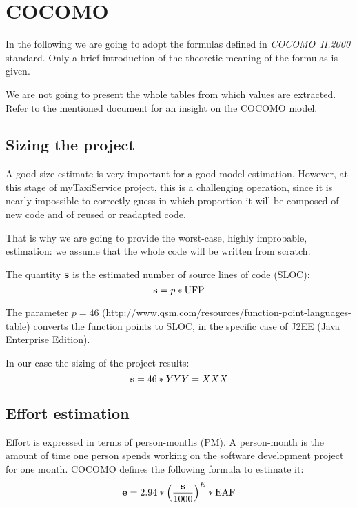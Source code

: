 \section{COCOMO}


In the following we are going to adopt the formulas defined in \mbox{\emph{COCOMO II.2000}} standard. Only a brief introduction of the theoretic meaning of the formulas is given. 

We are not going to present the whole tables from which values are extracted. Refer to the mentioned document for an insight on the COCOMO model. 


\subsection{Sizing the project}

A good size estimate is very important for a good model estimation. However, at this stage of myTaxiService project, this is a challenging operation, since it is nearly impossible to correctly guess in which proportion it will be composed of new code and of reused or readapted code.

That is why we are going to provide the \mbox{worst-case}, highly improbable, estimation: we assume that the whole code will be written from scratch. 

The quantity $\mathbf{s}$ is the estimated number of source lines of code (SLOC):
\begin{equation}
%
	\mSize = p * \mFP
%
\end{equation}

The parameter $ p = 46 $ (\url{http://www.qsm.com/resources/function-point-languages-table}) converts the function points to SLOC, in the specific case of J2EE (Java Enterprise Edition).

In our case the sizing of the project results:
\begin{equation}
%
	\mSize = 46 * YYY = XXX  %
%
\end{equation}



\subsection{Effort estimation}

Effort is expressed in terms of \mbox{person-months} (PM). A {person-month} is the amount of time one person spends working on the software development project for one month. COCOMO defines the following formula to estimate it:
\begin{equation}
%
	\mEffort = 2.94 * { \left( \frac{\mSize}{1000} \right) }^{E} * \eaf \label{eqn:effort}
%
\end{equation}


